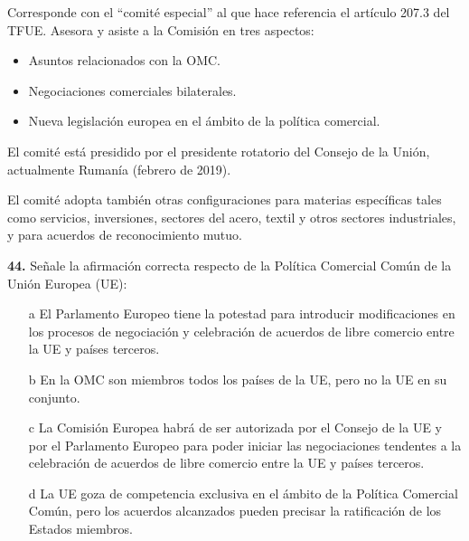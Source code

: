 \documentclass{nuevotema}
\begin{document}
\conceptos


Corresponde con el ``comité especial'' al que hace referencia el artículo 207.3 del TFUE. Asesora y asiste a la Comisión en tres aspectos:

\begin{itemize}
	\item Asuntos relacionados con la OMC.
	\item Negociaciones comerciales bilaterales.
	\item Nueva legislación europea en el ámbito de la política comercial.
\end{itemize}

El comité está presidido por el presidente rotatorio del Consejo de la Unión, actualmente Rumanía (febrero de 2019).

El comité adopta también otras configuraciones para materias específicas tales como servicios, inversiones, sectores del acero, textil y otros sectores industriales, y para acuerdos de reconocimiento mutuo.

\preguntas


\textbf{44.} Señale la afirmación correcta respecto de la Política Comercial Común de la Unión Europea (UE): 

\begin{itemize}
	\item[a] El Parlamento Europeo tiene la potestad para introducir modificaciones en los procesos de negociación y celebración de acuerdos de libre comercio entre la UE y países terceros.
	\item[b] En la OMC son miembros todos los países de la UE, pero no la UE en su conjunto.
	\item[c] La Comisión Europea habrá de ser autorizada por el Consejo de la UE y por el Parlamento Europeo para poder iniciar las negociaciones tendentes a la celebración de acuerdos de libre comercio entre la UE y países terceros.
	\item[d] La UE goza de competencia exclusiva en el ámbito de la Política Comercial Común, pero los acuerdos alcanzados pueden precisar la ratificación de los Estados miembros. 
\end{itemize}
\end{document}

